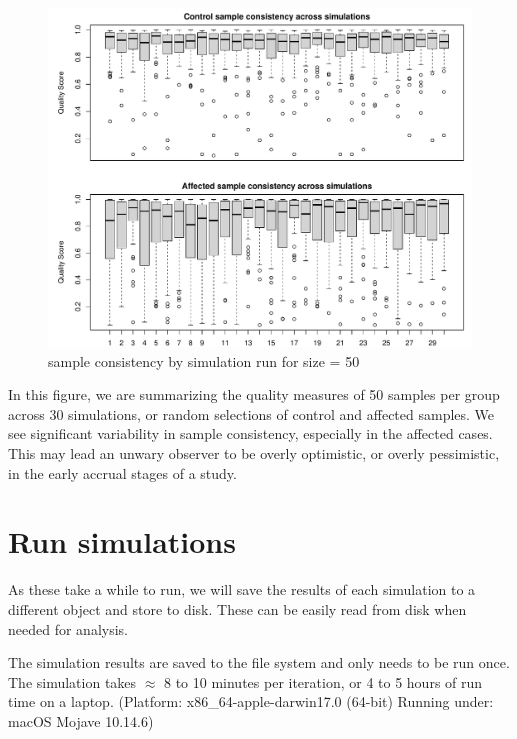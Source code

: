 \documentclass[
]{book}
\begin{document}
\begin{figure}
\centering
\includegraphics{Static/figures/hcc5hmC-glmnetSuite-look-sim-qual-0-50ONLY-1.pdf}
\caption{\label{fig:hcc5hmC-glmnetSuite-look-sim-qual-0-50ONLY}sample consistency by simulation run for size = 50}
\end{figure}

In this figure, we are summarizing the quality measures of 50 samples per group across
30 simulations, or random selections of control and affected samples.
We see significant variability in sample consistency, especially in the affected cases.
This may lead an unwary observer to be overly optimistic, or overly pessimistic,
in the early accrual stages of a study.

\hypertarget{run-simulations}{%
\section{Run simulations}\label{run-simulations}}

As these take a while to run,
we will save the results of each simulation to a different
object and store to disk. These can be easily read from disk
when needed for analysis.

The simulation results are saved to the file system and
only needs to be run once. The simulation takes \(\approx\) 8 to 10 minutes
per iteration, or 4 to 5 hours of run time on a laptop.
(Platform: x86\_64-apple-darwin17.0 (64-bit)
Running under: macOS Mojave 10.14.6)
\end{document}
